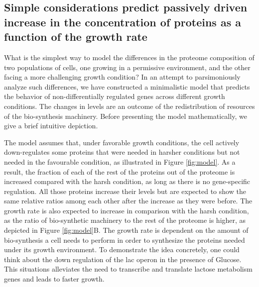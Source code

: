 \subsection{Simple considerations predict passively driven increase in the concentration of proteins as a function of the growth rate}
What is the simplest way to model the differences in the proteome composition of two populations of cells, one growing in a permissive environment, and the other facing a more challenging growth condition?
In an attempt to parsimoniously analyze such differences, we have constructed a minimalistic model that predicts the behavior of non-differentially regulated genes across different growth conditions. The changes in levels are an outcome of the redistribution of resources of the bio-synthesis machinery.
Before presenting the model mathematically, we give a brief intuitive depiction.

The model assumes that, under favorable growth conditions, the cell actively down-regulates some proteins that were needed in harsher conditions but not needed in the favourable condition, as illustrated in Figure \ref{fig:model}.
As a result, the fraction of each of the rest of the proteins out of the proteome is increased compared with the harsh condition, as long as there is no gene-specific regulation. All those proteins increase their levels but are expected to show the same relative ratios among each other after the increase as they were before. 
The growth rate is also expected to increase in comparison with the harsh condition, as the ratio of bio-synthetic machinery to the rest of the proteome is higher, as  depicted in Figure \ref{fig:model}B.
The growth rate is dependent on the amount of bio-synthesis a cell needs to perform in order to synthesize the proteins needed under its growth environment. 
To demonstrate the idea concretely, one could think about the down regulation of the lac operon in the presence of Glucose. This situations alleviates the need to transcribe and translate lactose metabolism genes and leads to faster growth.